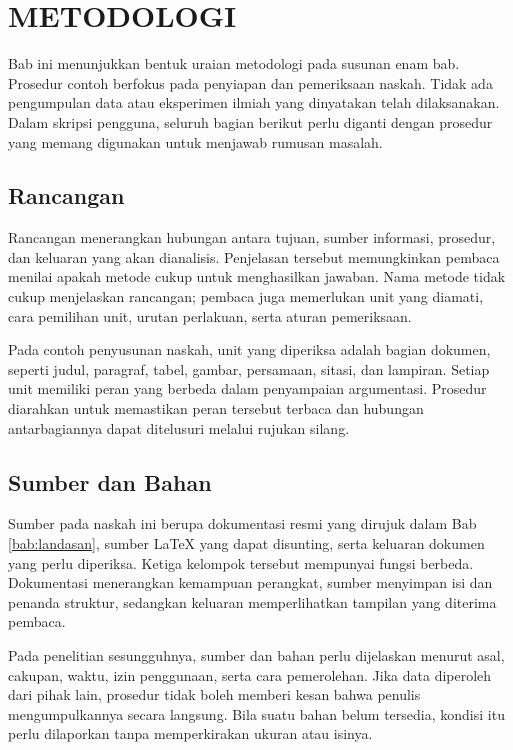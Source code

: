 \chapter{METODOLOGI}
\label{bab:metodologi}

Bab ini menunjukkan bentuk uraian metodologi pada susunan enam bab. Prosedur contoh berfokus pada penyiapan dan pemeriksaan naskah. Tidak ada pengumpulan data atau eksperimen ilmiah yang dinyatakan telah dilaksanakan. Dalam skripsi pengguna, seluruh bagian berikut perlu diganti dengan prosedur yang memang digunakan untuk menjawab rumusan masalah.

\section{Rancangan}

Rancangan menerangkan hubungan antara tujuan, sumber informasi, prosedur, dan keluaran yang akan dianalisis. Penjelasan tersebut memungkinkan pembaca menilai apakah metode cukup untuk menghasilkan jawaban. Nama metode tidak cukup menjelaskan rancangan; pembaca juga memerlukan unit yang diamati, cara pemilihan unit, urutan perlakuan, serta aturan pemeriksaan.

Pada contoh penyusunan naskah, unit yang diperiksa adalah bagian dokumen, seperti judul, paragraf, tabel, gambar, persamaan, sitasi, dan lampiran. Setiap unit memiliki peran yang berbeda dalam penyampaian argumentasi. Prosedur diarahkan untuk memastikan peran tersebut terbaca dan hubungan antarbagiannya dapat ditelusuri melalui rujukan silang.

\section{Sumber dan Bahan}

Sumber pada naskah ini berupa dokumentasi resmi yang dirujuk dalam Bab \ref{bab:landasan}, sumber \LaTeX{} yang dapat disunting, serta keluaran dokumen yang perlu diperiksa. Ketiga kelompok tersebut mempunyai fungsi berbeda. Dokumentasi menerangkan kemampuan perangkat, sumber menyimpan isi dan penanda struktur, sedangkan keluaran memperlihatkan tampilan yang diterima pembaca.

Pada penelitian sesungguhnya, sumber dan bahan perlu dijelaskan menurut asal, cakupan, waktu, izin penggunaan, serta cara pemerolehan. Jika data diperoleh dari pihak lain, prosedur tidak boleh memberi kesan bahwa penulis mengumpulkannya secara langsung. Bila suatu bahan belum tersedia, kondisi itu perlu dilaporkan tanpa memperkirakan ukuran atau isinya.


